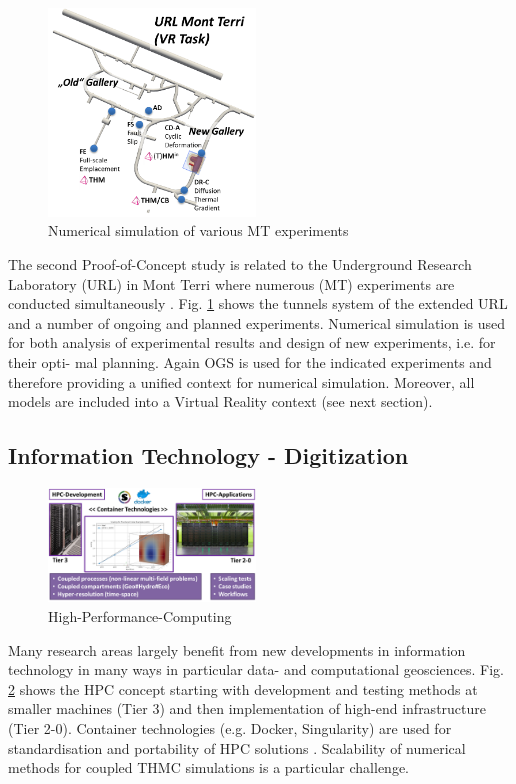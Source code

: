 \begin{figure}
\vspace{-5mm}
\centering
\includegraphics[width=0.49\textwidth]{figures/mt-vr-01a}
\caption{Numerical simulation of various MT experiments \cite{Rink20143857}}
\label{fig:mt-terri}
\end{figure}
The second Proof-of-Concept study is related to the Underground Research Laboratory (URL) in Mont Terri where numerous (MT) experiments are conducted simultaneously \cite{Bossart2017405,Bossart20173}. Fig. \ref{fig:mt-terri} shows the tunnels system of the extended URL and a number of ongoing and planned experiments. Numerical simulation is used for both analysis of experimental results and design of new experiments, i.e. for their opti- mal planning. Again OGS is used for the indicated experiments and therefore providing a unified context for numerical simulation. Moreover, all models are included into a Virtual Reality context (see next section).

\subsection*{Information Technology - Digitization}

\begin{figure}
\vspace{-3mm}
\centering
\includegraphics[width=0.49\textwidth]{figures/hpc-concept1}
\caption{High-Performance-Computing}
\label{fig:syn-hpc}
\end{figure}
Many research areas largely benefit from new developments in information technology in many ways in particular data- and computational geosciences.
Fig. \ref{fig:syn-hpc} shows the HPC concept starting with development and testing methods at smaller machines (Tier 3) and then implementation of high-end infrastructure (Tier 2-0). Container technologies (e.g. Docker, Singularity) are used for standardisation and portability of HPC solutions \cite{Bilke2019}. Scalability of numerical methods for coupled THMC simulations is a particular challenge.

